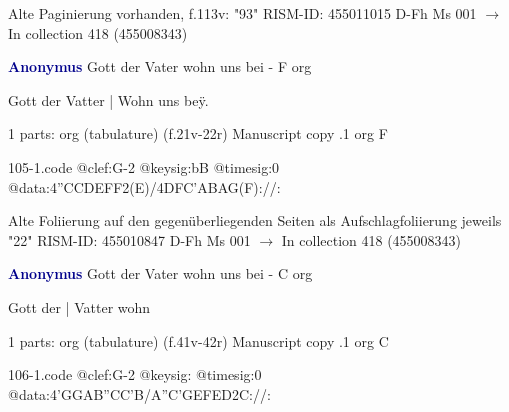 \documentclass[twocolumn]{book}
\begin{document}
\newline Alte Paginierung vorhanden, f.113v: "93"
\newline RISM-ID: 455011015
\newline D-Fh  Ms 001
\newline $\rightarrow$ In collection 418 (455008343)
      
\newline \par \vspace{7pt} \textcolor{darkblue}{\textbf{Anonymus  }}
\newline Gott der Vater wohn uns bei - F
\newline org
\newline \begin{itshape}[f.21v, at left:] Gott der Vatter | Wohn uns beÿ.\end{itshape} 
\newline \textcolor{darkblue}{}  1 parts: org (tabulature)  (f.21v-22r)
\newline Manuscript copy
.1  org  F  
\begin{filecontents*}{105-1.code}
@clef:G-2
@keysig:bB
@timesig:0
@data:4''CCDEFF2(E)/4DFC'ABAG(F)://:
\end{filecontents*}
\newline
%

\newline Alte Foliierung auf den gegenüberliegenden Seiten als Aufschlagfoliierung jeweils "22"
\newline RISM-ID: 455010847
\newline D-Fh  Ms 001
\newline $\rightarrow$ In collection 418 (455008343)
      
\newline \par \vspace{7pt} \textcolor{darkblue}{\textbf{Anonymus  }}
\newline Gott der Vater wohn uns bei - C
\newline org
\newline \begin{itshape}[f.41v, at left:] Gott der | Vatter wohn\end{itshape} 
\newline \textcolor{darkblue}{}  1 parts: org (tabulature)  (f.41v-42r)
\newline Manuscript copy
.1  org  C  
\begin{filecontents*}{106-1.code}
@clef:G-2
@keysig:
@timesig:0
@data:4'GGAB''CC'B/A''C'GEFED2C://:
\end{filecontents*}
\newline
%
\end{document}
